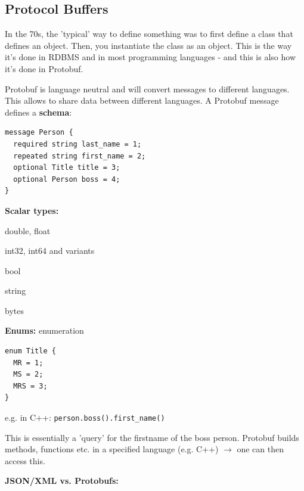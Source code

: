 \documentclass[11pt,oneside,a4paper]{article}
\begin{document}
\subsection{Protocol Buffers}

In the 70s, the 'typical' way to define something was to first define a class that defines an object. Then, you instantiate the class as an object. This is the way it's done in RDBMS and in most programming languages - and this is also how it's done in Protobuf.

Protobuf is language neutral and will convert messages to different languages. This allows to share data between different languages. A Protobuf message defines a \textbf{schema}:
\vspace{-\topsep}
\begin{verbatim}
message Person {
  required string last_name = 1;
  repeated string first_name = 2;
  optional Title title = 3;
  optional Person boss = 4;
}
\end{verbatim}
\vspace{-\topsep}

\textbf{Scalar types:}
\vspace{-\topsep}
\begin{multicols}{2}
	\begin{compactitem}
		\item double, float
		\item int32, int64 and variants
		\item bool
		\item string
		\item bytes
	\end{compactitem}
\end{multicols}

\newpage

\textbf{Enums:} enumeration
\vspace{-\topsep}
\begin{verbatim}
enum Title {
  MR = 1;
  MS = 2;
  MRS = 3;
}
\end{verbatim}
\vspace{-\topsep}

\hfill

e.g. in C++: \verb|person.boss().first_name()|

This is essentially a 'query' for the firstname of the boss person. Protobuf builds methods, functions etc. in a specified language (e.g. C++) $\rightarrow$ one can then access this.

\textbf{JSON/XML vs. Protobufs:}
\end{document}

